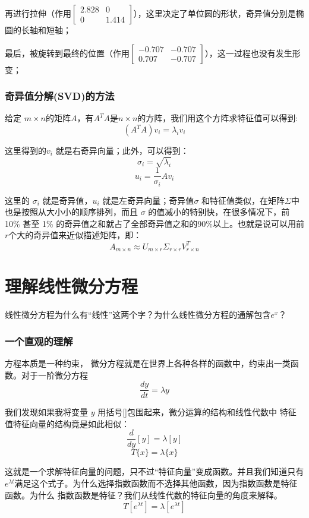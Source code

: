 \documentclass[12pt]{article}
\begin{document}
再进行拉伸（作用$\begin{bmatrix}2.828&0\\0&1.414\end{bmatrix}$），这里决定了单位圆的形状，奇异值分别是椭圆的长轴和短轴；

最后，被旋转到最终的位置（作用$\begin{bmatrix}-0.707&-0.707\\0.707&-0.707\end{bmatrix}$），这一过程也没有发生形变；

\subsubsection{奇异值分解(SVD)的方法}
给定 $m\times n$的矩阵$A$，有$A^TA$是$n\times n$的方阵，我们用这个方阵求特征值可以得到:
$$
(A^TA)v_i = \lambda_iv_i
$$

这里得到的$v_i$ 就是右奇异向量；此外，可以得到：
$$
\sigma_i = \sqrt{\lambda_i}
$$
$$
u_i = \frac{1}{\sigma_i}Av_i
$$

这里的 $\sigma_i$ 就是奇异值，$u_i$ 就是左奇异向量；奇异值$\sigma$ 和特征值类似，在矩阵$\Sigma$中也是按照从大小小的顺序排列，而且 $\sigma$ 的值减小的特别快，在很多情况下，前 10\% 甚至 1\% 的奇异值之和就占了全部奇异值之和的90\%以上。也就是说可以用前 $r$个大的奇异值来近似描述矩阵，即：
$$
A_{m\times n} \approx U_{m\times r}\Sigma_{r\times r}V^T_{r\times n}
$$

\section{理解线性微分方程\cite{How_To_Understand_Linear_Differential_Equation}}
线性微分方程为什么有“线性”这两个字？为什么线性微分方程的通解包含$e^x$？

\subsubsection{一个直观的理解\cite{Fantastic_Matrix_2}}
方程本质是一种约束， 微分方程就是在世界上各种各样的函数中，约束出一类函数。对于一阶微分方程
$$
\frac{dy}{dt} = \lambda y
$$

我们发现如果我将变量 $y$ 用括号[]包围起来，微分运算的结构和线性代数中 特征值特征向量的结构竟是如此相似：
$$
\frac{d}{dy}[y] = \lambda[y]
$$
$$
T\{x\} = \lambda\{x\}
$$

这就是一个求解特征向量的问题，只不过“特征向量”变成函数。并且我们知道只有 $e^{\lambda t}$满足这个式子。为什么选择指数函数而不选择其他函数，因为指数函数是特征函数。为什么 指数函数是特征？我们从线性代数的特征向量的角度来解释。
$$
T[e^{\lambda t}] = \lambda[e^{\lambda t}]
$$
\end{document}

